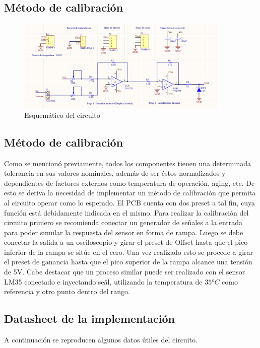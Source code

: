  \subsection{M\'etodo de calibraci\'on}

 \begin{figure}[H]
    \centering
    \includegraphics[width=0.9\textwidth]{../EJ6/Captures/EJ6_schematic}
    \caption{Esquem\'atico del circuito}
    \label{fig:EJ6_schematic} 
\end{figure}

 \subsection{M\'etodo de calibraci\'on}

 Como se mencion\'o previamente, todos los componentes tienen una determinada tolerancia en sus valores nominales, adem\'as de ser \'estos normalizados y dependientes de factores externos como temperatura de operaci\'on, aging, etc.
  De esto se deriva la necesidad de implementar un m\'etodo de calibraci\'on que permita al circuito operar como lo esperado. El PCB cuenta con dos preset a tal fin, cuya funci\'on est\'a debidamente indicada en el mismo.
  Para realizar la calibraci\'on del circuito primero se recomienda conectar un generador de señales a la entrada para poder simular la respuesta del sensor en forma de rampa.
 Luego se debe conectar la salida a un osciloscopio y girar el preset de Offset hasta que el pico inferior de la rampa se sit\'ue en el cero. Una vez realizado esto se procede a girar el preset de ganancia hasta que el pico superior de la rampa alcance una tensi\'on de 5V.
  Cabe destacar que un proceso similar puede ser realizado con el sensor LM35 conectado e inyectando se\~al, utilizando la temperatura de $35°C$ como referencia y otro punto dentro del rango.

  \subsection{Datasheet de la implementaci\'on}
    A continuaci\'on se reproducen algunos datos \'utiles del circuito.
    
